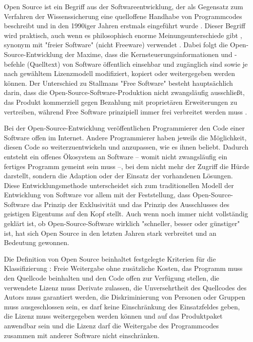 Open Source ist ein Begriff aus der Softwareentwicklung, der als Gegensatz zum Verfahren der Wissenssicherung \cite{Stallman_2002} eine quelloffene Handhabe von Programmcodes beschreibt und in den 1990iger Jahren erstmals eingeführt wurde \cite[:5]{Hippel_2003}. Dieser Begriff wird praktisch, auch wenn es philosophisch enorme Meinungsunterschiede gibt \cite[:5]{Hippel_2003}  \cite[:169]{Stallman_2002}, synonym mit "freier Software" (nicht Freeware) verwendet \cite{Naeder_2010} \cite[:414]{Mantz_2007}. Dabei folgt die Open-Source-Entwicklung der Maxime, dass die Kernsteuerungsinformationen und -befehle (Quelltext) von Software öffentlich einsehbar und zugänglich sind sowie je nach gewähltem Lizenzmodell modifiziert, kopiert oder weitergegeben werden können. Der Unterschied zu Stallmans "Free Software" besteht hauptsächlich darin, dass die Open-Source-Software-Produktion nicht zwangsläufig ausschließt, das Produkt kommerziell gegen Bezahlung mit proprietären Erweiterungen zu vertreiben, während Free Software prinzipiell immer frei verbreitet werden muss \cite{Stallman_2002}.

Bei der Open-Source-Entwicklung veröffentlichen Programmierer den Code einer Software offen im Internet. Andere Programmierer haben jeweils die Möglichkeit, diesen Code so weiterzuentwickeln und anzupassen, wie es ihnen beliebt. Dadurch entsteht ein offenes Ökosystem an Software – womit nicht zwangsläufig ein fertiges Programm gemeint sein muss –, bei dem nicht mehr der Zugriff die Hürde darstellt, sondern die Adaption oder der Einsatz der vorhandenen Lösungen. Diese Entwicklungsmethode unterscheidet sich zum traditionellen Modell der Entwicklung von Software vor allem mit der Feststellung, dass Open-Source-Software das Prinzip der Exklusivität und das Prinzip des Ausschlusses des geistigen Eigentums auf den Kopf stellt. Auch wenn noch immer nicht vollständig geklärt ist, ob Open-Source-Software wirklich "schneller, besser oder günstiger" ist, hat sich Open Source in den letzten Jahren stark verbreitet \cite{Lerner_2001} und an Bedeutung gewonnen.

Die Definition von Open Source beinhaltet festgelegte Kriterien für die Klassifizierung \cite{OSD_2003}: Freie Weitergabe ohne zusätzliche Kosten, das Programm muss den Quellcode beinhalten und den Code offen zur Verfügung stellen, die verwendete Lizenz muss Derivate zulassen, die Unversehrtheit des Quellcodes des Autors muss garantiert werden, die Diskriminierung von Personen oder Gruppen muss ausgeschlossen sein, es darf keine Einschränkung des Einsatzfeldes geben, die Lizenz muss weitergegeben werden können und auf das Produktpaket anwendbar sein und die Lizenz darf die Weitergabe des Programmcodes zusammen mit anderer Software nicht einschränken.


